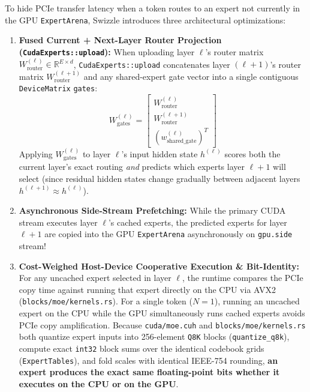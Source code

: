 \documentclass[10pt,a4paper]{article}
\theoremstyle{swzstyle}
\newcommand{\code}[1]{\texttt{#1}}
\begin{document}
To hide PCIe transfer latency when a token routes to an expert not currently in the GPU \code{ExpertArena}, Swizzle introduces three architectural optimizations:
\begin{enumerate}
  \item \textbf{Fused Current + Next-Layer Router Projection (\code{CudaExperts::upload}):} When uploading layer $\ell$'s router matrix $W_{\text{router}}^{(\ell)} \in \mathbb{R}^{E \times d}$, \code{CudaExperts::upload} concatenates layer $(\ell+1)$'s router matrix $W_{\text{router}}^{(\ell+1)}$ and any shared-expert gate vector into a single contiguous \code{DeviceMatrix} \code{gates}:
  \begin{equation}
    W_{\text{gates}}^{(\ell)} = \begin{bmatrix} W_{\text{router}}^{(\ell)} \\[2pt] W_{\text{router}}^{(\ell+1)} \\[2pt] \left(w_{\text{shared\_gate}}^{(\ell)}\right)^T \end{bmatrix}
  \end{equation}
  Applying $W_{\text{gates}}^{(\ell)}$ to layer $\ell$'s input hidden state $h^{(\ell)}$ scores both the current layer's exact routing \emph{and} predicts which experts layer $\ell+1$ will select (since residual hidden states change gradually between adjacent layers $h^{(\ell+1)} \approx h^{(\ell)}$).
  \item \textbf{Asynchronous Side-Stream Prefetching:} While the primary CUDA stream executes layer $\ell$'s cached experts, the predicted experts for layer $\ell+1$ are copied into the GPU \code{ExpertArena} asynchronously on \code{gpu.side} stream!
  \item \textbf{Cost-Weighed Host-Device Cooperative Execution \& Bit-Identity:} For any uncached expert selected in layer $\ell$, the runtime compares the PCIe copy time against running that expert directly on the CPU via AVX2 (\code{blocks/moe/kernels.rs}). For a single token ($N=1$), running an uncached expert on the CPU while the GPU simultaneously runs cached experts avoids PCIe copy amplification. Because \code{cuda/moe.cuh} and \code{blocks/moe/kernels.rs} both quantize expert inputs into 256-element \code{Q8K} blocks (\code{quantize\_q8k}), compute exact \code{int32} block sums over the identical codebook grids (\code{ExpertTables}), and fold scales with identical IEEE-754 rounding, \textbf{an expert produces the exact same floating-point bits whether it executes on the CPU or on the GPU}.
\end{enumerate}
\end{document}
